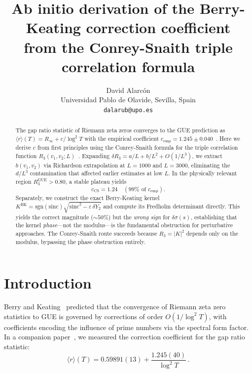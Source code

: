 \documentclass[11pt]{article}
\title{\textbf{Ab initio derivation of the Berry-Keating correction coefficient\\
from the Conrey-Snaith triple correlation formula}}
\author{David Alarc\'on\\
\small Universidad Pablo de Olavide, Sevilla, Spain\\
\small \texttt{dalarub@upo.es}}
\date{}
\begin{document}
\maketitle

\begin{abstract}
The gap ratio statistic of Riemann zeta zeros converges to the GUE prediction
as $\langle r\rangle(T) = R_\infty + c/\log^2 T$ with the empirical coefficient
$c_{\mathrm{emp}} = 1.245 \pm 0.040$~\cite{alarcon2026a}. Here we derive $c$
from first principles using the Conrey-Snaith formula for the triple correlation
function $R_3(v_1, v_2; L)$~\cite{conrey2005, conreysnaith2008}. Expanding
$\delta R_3 = a/L + b/L^2 + O(1/L^3)$, we extract $b(v_1, v_2)$ via
Richardson extrapolation at $L = 1000$ and $L = 3000$, eliminating
the $d/L^3$ contamination that affected earlier estimates at low $L$.
In the physically relevant region $R_3^{\mathrm{GUE}} > 0.80$, a stable
plateau yields
\begin{equation*}
c_{\mathrm{CS}} = 1.24 \quad (99\% \text{ of } c_{\mathrm{emp}}).
\end{equation*}
Separately, we construct the exact Berry-Keating kernel
$K^{\mathrm{BK}} = \mathrm{sgn}(\mathrm{sinc})\sqrt{\mathrm{sinc}^2 - \varepsilon\,\delta Y_2}$
and compute its Fredholm determinant directly. This yields the correct magnitude
($\sim 50\%$) but the \emph{wrong sign} for $\delta\sigma(s)$, establishing
that the kernel \emph{phase}---not the modulus---is the fundamental obstruction
for perturbative approaches. The Conrey-Snaith route succeeds because $R_3 = |K|^2$
depends only on the modulus, bypassing the phase obstruction entirely.
\end{abstract}


\section{Introduction}

Berry and Keating~\cite{berry1999, bogomolny1996} predicted that the convergence
of Riemann zeta zero statistics to GUE is governed by corrections of order
$O(1/\log^2 T)$, with coefficients encoding the influence of prime numbers via
the spectral form factor. In a companion paper~\cite{alarcon2026a}, we measured
the correction coefficient for the gap ratio statistic:
\begin{equation}
\langle r\rangle(T) = 0.59891(13) + \frac{1.245(40)}{\log^2 T}\,.
\label{eq:empirical}
\end{equation}
\end{document}
